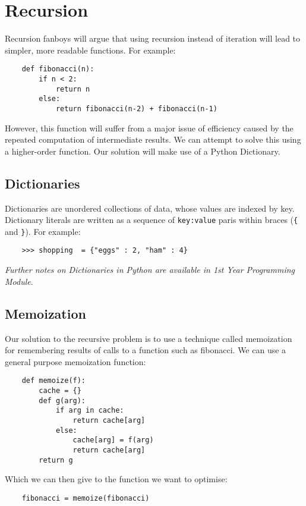 \section{Recursion}
Recursion fanboys will argue that using recursion instead of iteration will lead to simpler, more readable functions. For example:
\begin{verbatim}
    def fibonacci(n):
        if n < 2:
            return n
        else:
            return fibonacci(n-2) + fibonacci(n-1)
\end{verbatim}

However, this function will suffer from a major issue of efficiency caused by the repeated computation of intermediate results. We can attempt to solve this using a higher-order function. Our solution will make use of a Python Dictionary.

\subsection{Dictionaries}
Dictionaries are unordered collections of data, whose values are indexed by key. Dictionary literals are written as a sequence of \verb|key:value| paris within braces (\verb|{| and \verb|}|). For example:
\begin{verbatim}
    >>> shopping  = {"eggs" : 2, "ham" : 4}
\end{verbatim}

\textit{Further notes on Dictionaries in Python are available in 1st Year Programming Module}.

\subsection{Memoization}
Our solution to the recursive problem is to use a technique called memoization for remembering results of calls to a function such as fibonacci. We can use a general purpose memoization function:
\begin{verbatim}
    def memoize(f):
        cache = {}
        def g(arg):
            if arg in cache:
                return cache[arg]
            else:
                cache[arg] = f(arg)
                return cache[arg]
        return g
\end{verbatim}
Which we can then give to the function we want to optimise:
\begin{verbatim}
    fibonacci = memoize(fibonacci)
\end{verbatim}